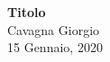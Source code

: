 \begin{titlepage}
    \begin{center}
		\vspace*{\fill}

		\vspace{2cm}
        \Huge\textbf{Titolo}\\
        
        \vspace{4cm}
        \vspace{1.5cm}
        \Large{Cavagna Giorgio}\\
        \vspace{0.5cm}
        \vspace{0.5cm}
        \large{15 Gennaio, 2020}
        \vspace*{\fill}
    \end{center}  
\end{titlepage}


